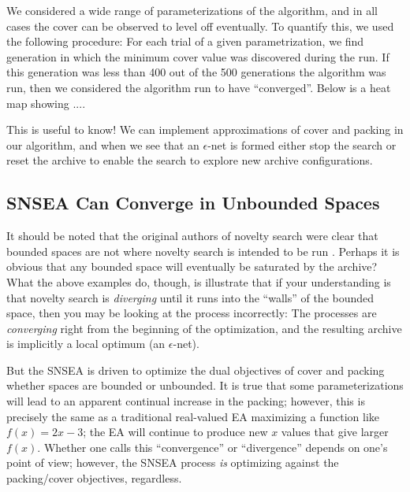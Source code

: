 \documentclass[twoside]{article}
\begin{document}
We considered a wide range of parameterizations of the algorithm, and in all cases the cover can be observed to level off eventually.  To quantify this, we used the following procedure:  For each trial of a given parametrization, we find generation in which the minimum cover value was discovered during the run.  If this generation was less than 400 out of the 500 generations the algorithm was run, then we considered the algorithm run to have ``converged''.  Below is a heat map showing  ....




This is useful to know!  We can implement approximations of cover and packing in our algorithm, and when we see that an $\epsilon$-net is formed either stop the search or reset the archive to enable the search to explore new archive configurations.  






\subsection{SNSEA Can Converge in Unbounded Spaces}
\label{subsec:unbounded}

It should be noted that the original authors of novelty search were clear that bounded spaces are not where novelty search is intended to be run \cite{LehmanStanley2008ssls}.  Perhaps it is obvious that any bounded space will eventually be saturated by the archive?  What the above examples do, though, is illustrate that if your understanding is that novelty search is \emph{diverging} until it runs into the ``walls'' of the bounded space, then you may be looking at the process incorrectly:  The processes are \emph{converging} right from the beginning of the optimization, and the resulting archive is implicitly a local optimum (an $\epsilon$-net).

But the SNSEA is driven to optimize the dual objectives of cover and packing whether spaces are bounded or unbounded.  It is true that some parameterizations will lead to an apparent continual increase in the packing; however, this is precisely the same as a traditional real-valued EA maximizing a function like $f(x)=2x -3$; the EA will continue to produce new $x$ values that give larger $f(x)$.  Whether one calls this ``convergence'' or ``divergence'' depends on one's point of view; however, the SNSEA process \emph{is} optimizing against the packing/cover objectives, regardless.
\end{document}
